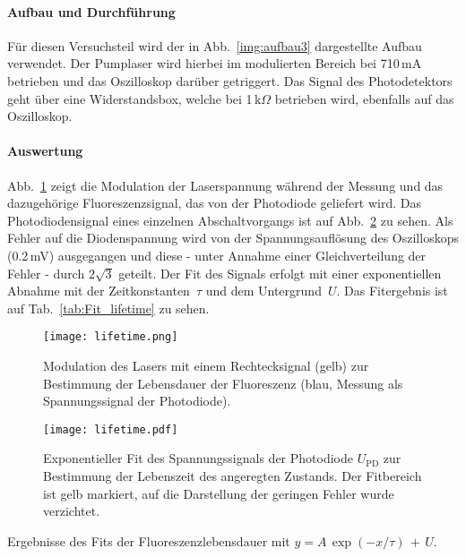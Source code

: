 \paragraph{Aufbau und Durchführung}

Für diesen Versuchsteil wird der in Abb.~\ref{img:aufbau3} dargestellte Aufbau verwendet.
Der Pumplaser wird hierbei im modulierten Bereich bei 710\,mA betrieben und das Oszilloskop darüber
getriggert. Das Signal des Photodetektors geht über eine Widerstandsbox, welche bei 1\,k$\Omega$
betrieben wird, ebenfalls auf das Oszilloskop.

\paragraph{Auswertung}
Abb.~\ref{img:Lifetime} zeigt die Modulation der Laserspannung während der Messung und das
dazugehörige Fluoreszenzsignal, das von der Photodiode geliefert wird.
Das Photodiodensignal eines einzelnen Abschaltvorgangs ist auf Abb.~\ref{img:LifetimeFit} zu sehen. 
Als Fehler auf die Diodenspannung wird von der Spannungsauflösung des Oszilloskops
(0.2\,mV) ausgegangen und diese - unter Annahme einer Gleichverteilung der Fehler - durch
$2\sqrt{3}$ geteilt.
Der Fit des Signals erfolgt mit einer exponentiellen Abnahme mit der Zeitkonstanten~$\tau$ und dem
Untergrund~$U$. Das Fitergebnis ist auf Tab.~\ref{tab:Fit_lifetime} zu sehen.


\begin{figure}[H]
\begin{center}
  \texttt{[image: lifetime.png]}
  \caption{Modulation des Lasers mit einem Rechtecksignal (gelb) zur Bestimmung der Lebensdauer der
  Fluoreszenz (blau, Messung als Spannungssignal der Photodiode).}
  \label{img:Lifetime}
\end{center}
\end{figure}


\begin{figure}[H]
\begin{center}
  \texttt{[image: lifetime.pdf]}
  \caption{Exponentieller Fit des Spannungssignals der Photodiode $U_{\text{PD}}$ zur Bestimmung der
  Lebenszeit des angeregten Zustands. Der Fitbereich ist gelb markiert, auf die Darstellung der geringen Fehler
  wurde verzichtet.}
  \label{img:LifetimeFit}
\end{center}
\end{figure}

\begin{table}[htb]
\caption{Ergebnisse des Fits der Fluoreszenzlebensdauer mit
$y=A\,\exp(-x/\tau)\,+\,U$.}

\label{tab:Fit_lifetime}
\end{table}



